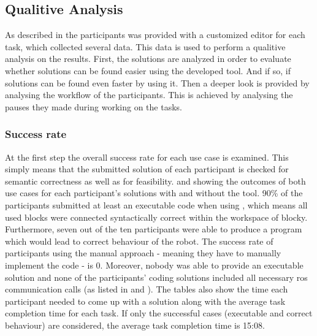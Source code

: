 \subsection{Qualitive Analysis}
As described in  the participants was provided with a customized editor for each task, which collected several data. This data is used to perform a qualitive analysis on the results. First, the solutions are analyzed in order to evaluate whether solutions can be found easier using the developed tool. And if so, if solutions can be found even faster by using it. Then a deeper look is provided by analysing the workflow of the participants. This is achieved by analysing the pauses they made during working on the tasks.

\subsubsection*{Success rate}
At the first step the overall success rate for each use case is examined. This simply means that the submitted solution of each participant is checked for semantic correctness as well as for feasibility.  and  showing the outcomes of both use cases for each participant's solutions with and without the tool. 90\% of the participants submitted at least an executable code when using \toolname{}, which means all used blocks were connected syntactically correct within the workspace of blocky. Furthermore, seven out of the ten participants were able to produce a program which would lead to correct behaviour of the robot. The success rate of participants using the manual approach - meaning they have to manually implement the code - is 0. Moreover, nobody was able to provide an executable solution and none of the participants' coding solutions included all necessary \gls{ros} communication calls (as listed in  and ). The tables also show the time each participant needed to come up with a solution along with the average task completion time for each task. If only the successful cases (executable and correct behaviour) are considered, the average task completion time is 15:08.

